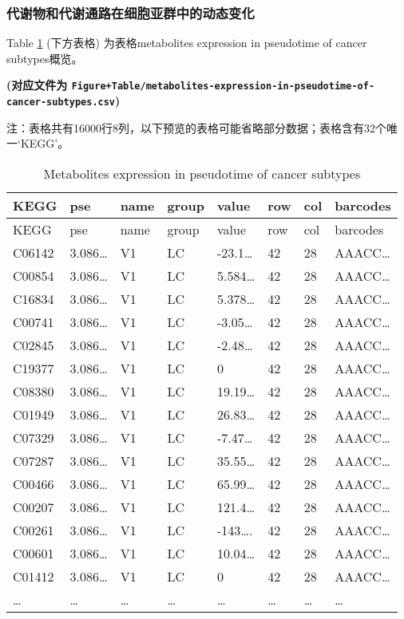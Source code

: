 \documentclass[
]{article}
\begin{document}
\hypertarget{ux4ee3ux8c22ux7269ux548cux4ee3ux8c22ux901aux8defux5728ux7ec6ux80deux4e9aux7fa4ux4e2dux7684ux52a8ux6001ux53d8ux5316}{%
\subsubsection{代谢物和代谢通路在细胞亚群中的动态变化}\label{ux4ee3ux8c22ux7269ux548cux4ee3ux8c22ux901aux8defux5728ux7ec6ux80deux4e9aux7fa4ux4e2dux7684ux52a8ux6001ux53d8ux5316}}

Table \ref{tab:metabolites-expression-in-pseudotime-of-cancer-subtypes} (下方表格) 为表格metabolites expression in pseudotime of cancer subtypes概览。

\textbf{(对应文件为 \texttt{Figure+Table/metabolites-expression-in-pseudotime-of-cancer-subtypes.csv})}

\begin{center}\begin{tcolorbox}[colback=gray!10, colframe=gray!50, width=0.9\linewidth, arc=1mm, boxrule=0.5pt]注：表格共有16000行8列，以下预览的表格可能省略部分数据；表格含有32个唯一`KEGG'。
\end{tcolorbox}
\end{center}

\begin{longtable}[]{@{}llllllll@{}}
\caption{\label{tab:metabolites-expression-in-pseudotime-of-cancer-subtypes}Metabolites expression in pseudotime of cancer subtypes}\tabularnewline
\toprule
KEGG & pse & name & group & value & row & col & barcodes\tabularnewline
\midrule
\endfirsthead
\toprule
KEGG & pse & name & group & value & row & col & barcodes\tabularnewline
\midrule
\endhead
C06142 & 3.086\ldots{} & V1 & LC & -23.1\ldots{} & 42 & 28 & AAACC\ldots{}\tabularnewline
C00854 & 3.086\ldots{} & V1 & LC & 5.584\ldots{} & 42 & 28 & AAACC\ldots{}\tabularnewline
C16834 & 3.086\ldots{} & V1 & LC & 5.378\ldots{} & 42 & 28 & AAACC\ldots{}\tabularnewline
C00741 & 3.086\ldots{} & V1 & LC & -3.05\ldots{} & 42 & 28 & AAACC\ldots{}\tabularnewline
C02845 & 3.086\ldots{} & V1 & LC & -2.48\ldots{} & 42 & 28 & AAACC\ldots{}\tabularnewline
C19377 & 3.086\ldots{} & V1 & LC & 0 & 42 & 28 & AAACC\ldots{}\tabularnewline
C08380 & 3.086\ldots{} & V1 & LC & 19.19\ldots{} & 42 & 28 & AAACC\ldots{}\tabularnewline
C01949 & 3.086\ldots{} & V1 & LC & 26.83\ldots{} & 42 & 28 & AAACC\ldots{}\tabularnewline
C07329 & 3.086\ldots{} & V1 & LC & -7.47\ldots{} & 42 & 28 & AAACC\ldots{}\tabularnewline
C07287 & 3.086\ldots{} & V1 & LC & 35.55\ldots{} & 42 & 28 & AAACC\ldots{}\tabularnewline
C00466 & 3.086\ldots{} & V1 & LC & 65.99\ldots{} & 42 & 28 & AAACC\ldots{}\tabularnewline
C00207 & 3.086\ldots{} & V1 & LC & 121.4\ldots{} & 42 & 28 & AAACC\ldots{}\tabularnewline
C00261 & 3.086\ldots{} & V1 & LC & -143\ldots. & 42 & 28 & AAACC\ldots{}\tabularnewline
C00601 & 3.086\ldots{} & V1 & LC & 10.04\ldots{} & 42 & 28 & AAACC\ldots{}\tabularnewline
C01412 & 3.086\ldots{} & V1 & LC & 0 & 42 & 28 & AAACC\ldots{}\tabularnewline
\ldots{} & \ldots{} & \ldots{} & \ldots{} & \ldots{} & \ldots{} & \ldots{} & \ldots{}\tabularnewline
\bottomrule
\end{longtable}
\end{document}
